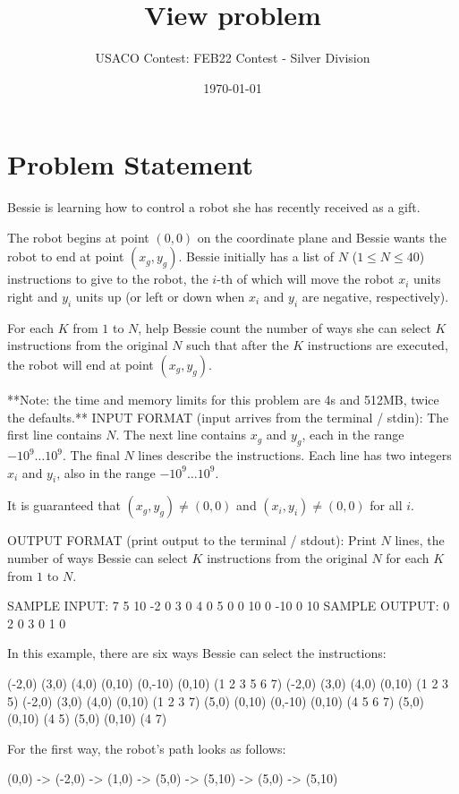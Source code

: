 \documentclass[12pt]{article}
\title{View problem}
\author{USACO Contest: FEB22 Contest - Silver Division}
\date{\today}
\begin{document}
\maketitle

\section*{Problem Statement}

Bessie is learning how to control a robot she has recently received as a gift.

The robot begins at point $(0, 0)$ on the coordinate plane and Bessie wants the
robot to end at point $(x_g, y_g)$. Bessie initially has a list of $N$
($1\le N\le 40$)  instructions to give to the robot, the $i$-th of which will
move the robot $x_i$ units right and $y_i$ units up (or left or down when $x_i$
and $y_i$ are negative, respectively).

For each $K$ from $1$ to $N$, help Bessie count the number of ways she can
select $K$ instructions from the original $N$ such that after the $K$
instructions are executed, the robot will end at point $(x_g, y_g)$.

**Note: the time and memory limits for this problem are 4s and 512MB, twice
the defaults.**
INPUT FORMAT (input arrives from the terminal / stdin):
The first line contains $N$. The next line contains $x_g$ and $y_g$, each in the
range $-10^9 \ldots 10^9$. The final $N$ lines describe the instructions. Each
line has two integers $x_i$ and $y_i$, also in the range $-10^9 \ldots 10^9$. 

It is guaranteed that $(x_g,y_g)\neq (0,0)$ and $(x_i,y_i)\neq (0,0)$ for all
$i$.

OUTPUT FORMAT (print output to the terminal / stdout):
Print $N$ lines, the number of ways Bessie can select $K$ instructions from the
original $N$ for each $K$ from $1$ to $N$.

SAMPLE INPUT:
7
5 10
-2 0
3 0
4 0
5 0
0 10
0 -10
0 10
SAMPLE OUTPUT: 
0
2
0
3
0
1
0

In this example, there are six ways Bessie can select the instructions:


(-2,0) (3,0) (4,0) (0,10) (0,-10) (0,10) (1 2 3 5 6 7)
(-2,0) (3,0) (4,0) (0,10) (1 2 3 5)
(-2,0) (3,0) (4,0) (0,10) (1 2 3 7)
(5,0) (0,10) (0,-10) (0,10) (4 5 6 7)
(5,0) (0,10) (4 5)
(5,0) (0,10) (4 7)

For the first way, the robot's path looks as follows:


(0,0) -> (-2,0) -> (1,0) -> (5,0) -> (5,10) -> (5,0) -> (5,10)
\end{document}
